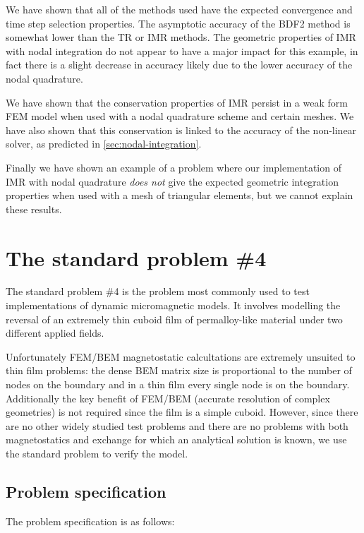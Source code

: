 We have shown that all of the methods used have the expected convergence and time step selection properties.
The asymptotic accuracy of the BDF2 method is somewhat lower than the TR or IMR methods.
The geometric properties of IMR with nodal integration do not appear to have a major impact for this example, in fact there is a slight decrease in accuracy likely due to the lower accuracy of the nodal quadrature.

We have shown that the conservation properties of IMR persist in a weak form FEM model when used with a nodal quadrature scheme and certain meshes.
We have also shown that this conservation is linked to the accuracy of the non-linear solver, as predicted in \cref{sec:nodal-integration}.

Finally we have shown an example of a problem where our implementation of IMR with nodal quadrature \emph{does not} give the expected geometric integration properties when used with a mesh of triangular elements, but we cannot explain these results.




\FloatBarrier
\section{The \mumag standard problem \#4}

The \mumag standard problem \#4 is the problem most commonly used to test implementations of dynamic micromagnetic models.
It involves modelling the reversal of an extremely thin cuboid film of permalloy-like material under two different applied fields.

Unfortunately FEM/BEM magnetostatic calcultations are extremely unsuited to thin film problems: the dense BEM matrix size is proportional to the number of nodes on the boundary and in a thin film every single node is on the boundary.
Additionally the key benefit of FEM/BEM (accurate resolution of complex geometries) is not required since the film is a simple cuboid.
However, since there are no other widely studied test problems and there are no problems with both magnetostatics and exchange for which an analytical solution is known, we use the standard problem to verify the model.


\subsection{Problem specification}

The problem specification is as follows:

